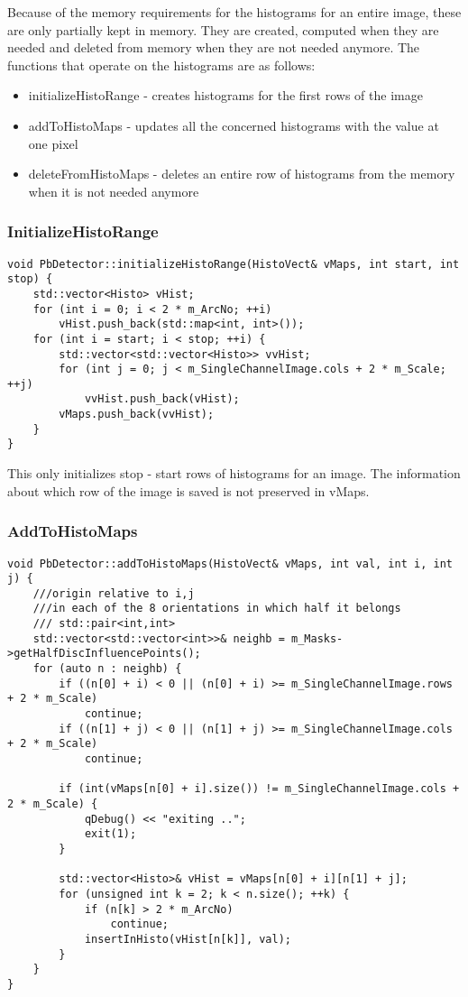 Because of the memory requirements for the histograms for an entire image, these are only partially kept in memory. They are created, computed when they are needed and deleted from memory when they are not needed anymore. The functions that operate on the histograms are as follows:

\begin{itemize}
	\item initializeHistoRange - creates histograms for the first rows of the image
	\item addToHistoMaps - updates all the concerned histograms with the value at one pixel
	\item deleteFromHistoMaps - deletes an entire row of histograms from the memory when it is not needed anymore	
\end{itemize} 

\subsubsection{InitializeHistoRange}

\begin{lstlisting}
void PbDetector::initializeHistoRange(HistoVect& vMaps, int start, int stop) {
	std::vector<Histo> vHist;
	for (int i = 0; i < 2 * m_ArcNo; ++i)
		vHist.push_back(std::map<int, int>());
	for (int i = start; i < stop; ++i) {
		std::vector<std::vector<Histo>> vvHist;
		for (int j = 0; j < m_SingleChannelImage.cols + 2 * m_Scale; ++j)
			vvHist.push_back(vHist);
		vMaps.push_back(vvHist);
	}
}
\end{lstlisting}

This only initializes stop - start rows of histograms for an image. The information about which row of the image is saved is not preserved in vMaps.

\subsubsection{AddToHistoMaps}

\begin{lstlisting}
void PbDetector::addToHistoMaps(HistoVect& vMaps, int val, int i, int j) {
	///origin relative to i,j
	///in each of the 8 orientations in which half it belongs
	/// std::pair<int,int>
	std::vector<std::vector<int>>& neighb = m_Masks->getHalfDiscInfluencePoints();
	for (auto n : neighb) {
		if ((n[0] + i) < 0 || (n[0] + i) >= m_SingleChannelImage.rows + 2 * m_Scale)
			continue;
		if ((n[1] + j) < 0 || (n[1] + j) >= m_SingleChannelImage.cols + 2 * m_Scale)
			continue;
		
		if (int(vMaps[n[0] + i].size()) != m_SingleChannelImage.cols + 2 * m_Scale) {
			qDebug() << "exiting ..";
			exit(1);
		}
	
		std::vector<Histo>& vHist = vMaps[n[0] + i][n[1] + j];
		for (unsigned int k = 2; k < n.size(); ++k) {
			if (n[k] > 2 * m_ArcNo)
				continue;
			insertInHisto(vHist[n[k]], val);
		}
	}
}
\end{lstlisting}

